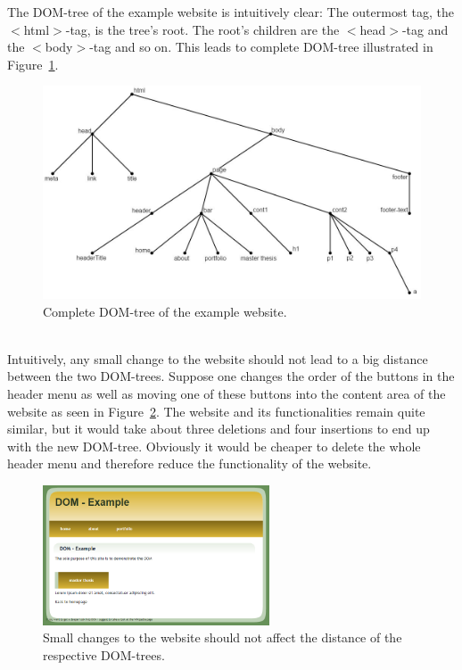 The DOM-tree of the example website is intuitively clear: The outermost tag, the $<$html$>$-tag, is the tree's root. The root's children are the $<$head$>$-tag and the $<$body$>$-tag and so on. This leads to complete DOM-tree illustrated in Figure~\ref{fig:DOM_0}.
\begin{figure}[!h]
    \centering
        \includegraphics[width=1\textwidth]{figures/DOM_0.jpg}
        \caption{Complete DOM-tree of the example website.}
        \label{fig:DOM_0}
\end{figure}
\\
Intuitively, any small change to the website should not lead to a big distance between the two DOM-trees. Suppose one changes the order of the buttons in the header menu as well as moving one of these buttons into the content area of the website as seen in Figure~\ref{fig:website_1}. The website and its functionalities remain quite similar, but it would take about three deletions and four insertions to end up with the new DOM-tree. Obviously it would be cheaper to delete the whole header menu and therefore reduce the functionality of the website. 
\begin{figure}[!h]
    \centering
        \includegraphics[width=0.60\textwidth]{figures/DOM_website_1.png}
        \caption{Small changes to the website should not affect the distance of the respective DOM-trees.}
        \label{fig:website_1}
\end{figure} 

